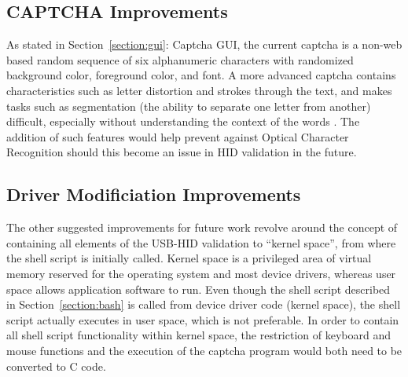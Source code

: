\documentclass[pagenumbers]{ieee}
\begin{document}
\subsection{CAPTCHA Improvements}
\label{section:futureworkcaptcha}

As stated in Section~\ref{section:gui}: Captcha GUI, the current captcha is a non-web based random sequence of six alphanumeric characters with randomized background color, foreground color, and font. A more advanced captcha contains characteristics such as letter distortion and strokes through the text, and makes tasks such as segmentation (the ability to separate one letter from another) difficult, especially without understanding the context of the words \cite{captcha}. The addition of such features would help prevent against Optical Character Recognition should this become an issue in HID validation in the future.

\subsection{Driver Modificiation Improvements}
\label{section:futureworkdriver}

The other suggested improvements for future work revolve around the concept of containing all elements of the USB-HID validation to ``kernel space'', from where the shell script is initially called. Kernel space is a privileged area of virtual memory reserved for the operating system and most device drivers, whereas user space allows application software to run. Even though the shell script described in Section~\ref{section:bash} is called from device driver code (kernel space), the shell script actually executes in user space, which is not preferable. In order to contain all shell script functionality within kernel space, the restriction of keyboard and mouse functions and the execution of the captcha program would both need to be converted to C code. 
\end{document}
